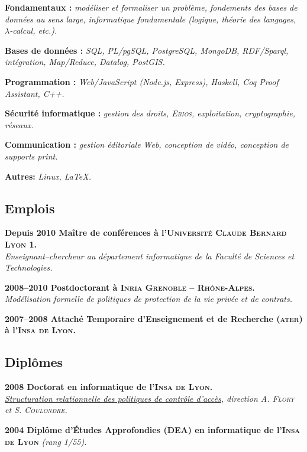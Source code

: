 \documentclass[12pt,a4paper]{article}
\newcommand{\activite}[1]{\textbf{#1}\xspace}
\newcommand{\comment}[1]{\textsl{#1}\xspace}
\newcommand{\INSAL}{\textsc{Insa de Lyon}\xspace}
\newcommand{\INRIARA}{\textsc{Inria Grenoble -- Rh\^one-Alpes}\xspace}
\newcommand{\UCBL}{\textsc{Universit{\'e} Claude Bernard Lyon 1}\xspace}
\newcommand{\ATER}{\textsc{ater}\xspace}
\begin{document}
  \activite{Fondamentaux :}
  \comment{modéliser et formaliser un problème, fondements des bases de données au sens large, informatique fondamentale (logique, théorie des langages, $\lambda$-calcul, etc.).}

  \activite{Bases de données :}
  \comment{SQL, PL/pgSQL, PostgreSQL, MongoDB, RDF/Sparql, intégration, Map/Reduce, Datalog, PostGIS.}

  \activite{Programmation :}
  \comment{Web/JavaScript (Node.js, Express), Haskell, Coq Proof Assistant, C++.}

  \activite{Sécurité informatique :}
  \comment{gestion des droits, \textsc{Ebios}, exploitation, cryptographie, réseaux.}

  \activite{Communication :}
  \comment{gestion éditoriale Web, conception de vidéo, conception de supports \emph{print}.}

  \activite{Autres:}
  \comment{Linux, \LaTeX.}

\subsection*{Emplois} 

  \activite{Depuis 2010 Maître de conférences à l'\UCBL.}\\
  \comment{Enseignant--chercheur au département informatique de la Faculté de Sciences et Technologies.} 
  
  \activite{2008--2010 Postdoctorant à \INRIARA.}\\
  \comment{Modélisation formelle de politiques de protection de la vie privée et de contrats.} 
  
  \activite{2007--2008 Attaché Temporaire d'Enseignement et de Recherche (\ATER) à l'\INSAL.}

\subsection*{Diplômes}

     \activite{2008 Doctorat en informatique de l'\INSAL.}\\
    \comment{\href{https://www.theses.fr/131879375}{Structuration relationnelle des politiques de contrôle d'accès}, direction \textsc{A. Flory} et S. \textsc{Coulondre}.}
    
   \activite{2004 Diplôme d'Études Approfondies (DEA) en informatique de l'\INSAL}
    \comment{(rang 1\ier/55).}
\end{document}
